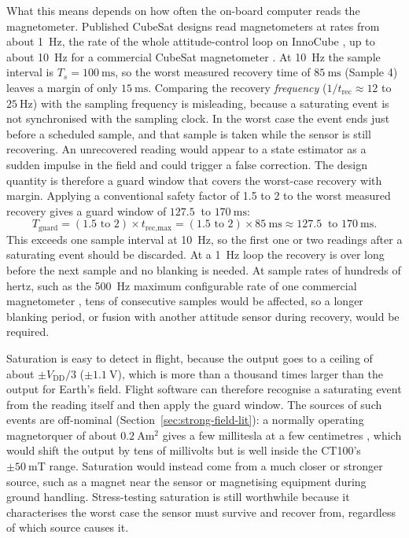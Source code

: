 \documentclass[12pt,a4paper]{article}
\begin{document}
What this means depends on how often the on-board computer reads the magnetometer. Published CubeSat designs read magnetometers at rates from about \SI{1}{\hertz}, the rate of the whole attitude-control loop on InnoCube \cite{djebko_lelar}, up to about \SI{10}{\hertz} for a commercial CubeSat magnetometer \cite{nss_magnetometer}. At \SI{10}{\hertz} the sample interval is $T_s = \SI{100}{\milli\second}$, so the worst measured recovery time of $\SI{85}{\milli\second}$ (Sample 4) leaves a margin of only $\SI{15}{\milli\second}$. Comparing the recovery \emph{frequency} ($1/t_{\text{rec}} \approx 12$ to $\SI{25}{\hertz}$) with the sampling frequency is misleading, because a saturating event is not synchronised with the sampling clock. In the worst case the event ends just before a scheduled sample, and that sample is taken while the sensor is still recovering. An unrecovered reading would appear to a state estimator as a sudden impulse in the field and could trigger a false correction. The design quantity is therefore a guard window that covers the worst-case recovery with margin. Applying a conventional safety factor of 1.5 to 2 to the worst measured recovery gives a guard window of $\SI{127.5}{}$ to $\SI{170}{\milli\second}$:
\begin{equation}
T_{\text{guard}} = (1.5 \text{ to } 2) \times t_{\text{rec,max}} = (1.5 \text{ to } 2) \times \SI{85}{\milli\second} \approx \SI{127.5}{} \text{ to } \SI{170}{\milli\second}.
\end{equation}
This exceeds one sample interval at \SI{10}{\hertz}, so the first one or two readings after a saturating event should be discarded. At a \SI{1}{\hertz} loop the recovery is over long before the next sample and no blanking is needed. At sample rates of hundreds of hertz, such as the \SI{500}{\hertz} maximum configurable rate of one commercial magnetometer \cite{mm200_datasheet}, tens of consecutive samples would be affected, so a longer blanking period, or fusion with another attitude sensor during recovery, would be required.

Saturation is easy to detect in flight, because the output goes to a ceiling of about $\pm V_{\text{DD}}/3$ ($\pm\SI{1.1}{\volt}$), which is more than a thousand times larger than the output for Earth's field. Flight software can therefore recognise a saturating event from the reading itself and then apply the guard window. The sources of such events are off-nominal (Section~\ref{sec:strong-field-lit}): a normally operating magnetorquer of about $\SI{0.2}{\ampere\metre\squared}$ gives a few millitesla at a few centimetres \cite{isis_imtq}, which would shift the output by tens of millivolts but is well inside the CT100's $\pm\SI{50}{\milli\tesla}$ range. Saturation would instead come from a much closer or stronger source, such as a magnet near the sensor or magnetising equipment during ground handling. Stress-testing saturation is still worthwhile because it characterises the worst case the sensor must survive and recover from, regardless of which source causes it.
\end{document}
